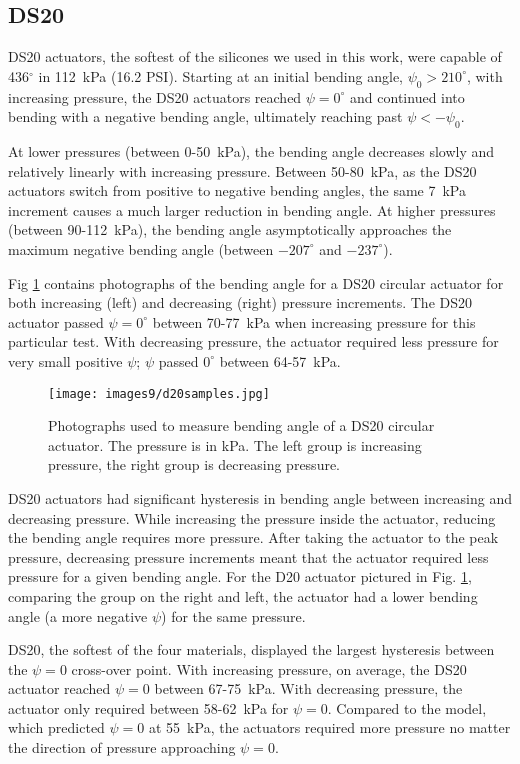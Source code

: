 \clearpage  
\subsection{DS20}

DS20 actuators, the softest of the silicones we used in this work, were capable of 436$^\circ$ in 112~kPa (16.2 PSI). Starting at an initial bending angle, $\psi_0>210^\circ$, with increasing pressure, the DS20 actuators reached $\psi=0^\circ$ and continued into bending with a negative bending angle, ultimately reaching past $\psi<-\psi_0$. 

At lower pressures (between 0-50~kPa), the bending angle decreases slowly and relatively linearly with increasing pressure. Between 50-80~kPa, as the DS20 actuators switch from positive to negative bending angles, the same 7~kPa increment causes a much larger reduction in bending angle. At higher pressures (between 90-112~kPa), the bending angle asymptotically approaches the maximum negative bending angle (between $-207^\circ$ and $-237^\circ$). 

Fig \ref{fig:d20samples} contains photographs of the bending angle for a DS20 circular actuator for both increasing (left) and decreasing (right) pressure increments. The DS20 actuator passed $\psi=0^\circ$ between 70-77~kPa when increasing pressure for this particular test. With decreasing pressure, the actuator required less pressure for very small positive $\psi$; $\psi$ passed $0^\circ$ between 64-57~kPa. 

\begin{figure}[ht]
    \centering
     \texttt{[image: images9/d20samples.jpg]}
    \caption{Photographs used to measure bending angle of a DS20 circular actuator. The pressure is in kPa. The left group is increasing pressure, the right group is decreasing pressure.}
    \label{fig:d20samples}
\end{figure}

DS20 actuators had significant hysteresis in bending angle between increasing and decreasing pressure. While increasing the pressure inside the actuator, reducing the bending angle requires more pressure. After taking the actuator to the peak pressure, decreasing pressure increments meant that the actuator required less pressure for a given bending angle. For the D20 actuator pictured in Fig. \ref{fig:d20samples}, comparing the group on the right and left, the actuator had a lower bending angle (a more negative $\psi$) for the same pressure.  

DS20, the softest of the four materials, displayed the largest hysteresis between the $\psi=0$ cross-over point. With increasing pressure, on average, the DS20 actuator reached $\psi=0$ between 67-75~kPa. With decreasing pressure, the actuator only required between 58-62~kPa for $\psi=0$. Compared to the model, which predicted $\psi=0$ at 55~kPa, the actuators required more pressure no matter the direction of pressure approaching $\psi=0$. 

